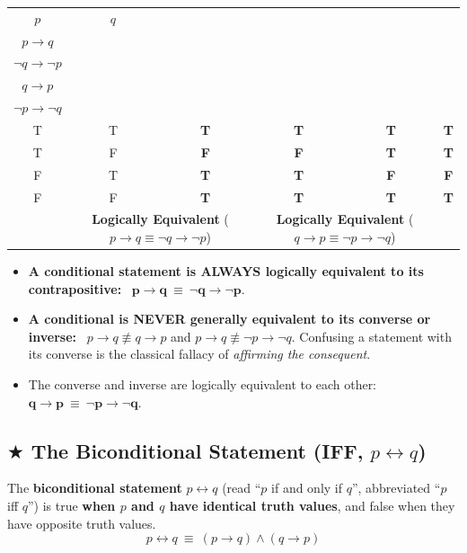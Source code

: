 \documentclass[11pt,a4paper]{article}
\begin{document}
\begin{center}
\renewcommand{\arraystretch}{1.2}
\small
\begin{tabular}{|c|c|c|c|c|c|}
\hline
\rowcolor{navy!15} $p$ & $q$ & \shortstack{\textbf{Conditional}\\$p \rightarrow q$} & \shortstack{\textbf{Contrapositive}\\$\neg q \rightarrow \neg p$} & \shortstack{\textbf{Converse}\\$q \rightarrow p$} & \shortstack{\textbf{Inverse}\\$\neg p \rightarrow \neg q$} \\
\hline
T & T & \textbf{T} & \textbf{T} & \textbf{T} & \textbf{T} \\
T & F & \textbf{F} & \textbf{F} & \textbf{T} & \textbf{T} \\
F & T & \textbf{T} & \textbf{T} & \textbf{F} & \textbf{F} \\
F & F & \textbf{T} & \textbf{T} & \textbf{T} & \textbf{T} \\
\hline
\rowcolor{lightgold} \multicolumn{2}{|c|}{\textbf{Equivalence}} & \multicolumn{2}{c|}{\textbf{Logically Equivalent} ($p \to q \equiv \neg q \to \neg p$)} & \multicolumn{2}{c|}{\textbf{Logically Equivalent} ($q \to p \equiv \neg p \to \neg q$)} \\
\hline
\end{tabular}
\end{center}

\begin{notebox}
\begin{itemize}
    \item \textbf{A conditional statement is ALWAYS logically equivalent to its contrapositive:} \ $\mathbf{p \rightarrow q \ \equiv \ \neg q \rightarrow \neg p}$.
    \item \textbf{A conditional is NEVER generally equivalent to its converse or inverse:} \ $p \rightarrow q \not\equiv q \rightarrow p$ and $p \rightarrow q \not\equiv \neg p \rightarrow \neg q$. Confusing a statement with its converse is the classical fallacy of \textit{affirming the consequent}.
    \item The converse and inverse are logically equivalent to each other: \ $\mathbf{q \rightarrow p \ \equiv \ \neg p \rightarrow \neg q}$.
\end{itemize}
\end{notebox}

\subsection{\texorpdfstring{$\bigstar$ }{*}The Biconditional Statement (IFF, \texorpdfstring{$p \leftrightarrow q$}{p <-> q})}
\begin{defbox}[Biconditional]
The \textbf{biconditional statement} $p \leftrightarrow q$ (read ``$p$ if and only if $q$'', abbreviated ``$p$ iff $q$'') is true \textbf{when $p$ and $q$ have identical truth values}, and false when they have opposite truth values.
\[
p \leftrightarrow q \ \equiv \ (p \rightarrow q) \wedge (q \rightarrow p)
\]
\end{defbox}
\end{document}
